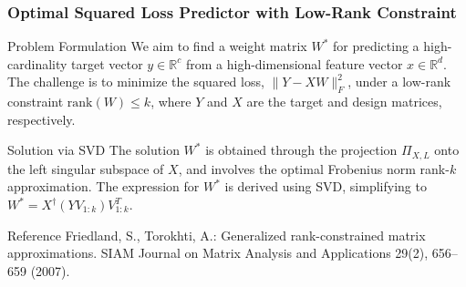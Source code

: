 \documentclass{beamer}
\begin{document}


\begin{frame}
\frametitle{Optimal Squared Loss Predictor with Low-Rank Constraint}
\begin{block}{Problem Formulation}
We aim to find a weight matrix \( W^* \) for predicting a high-cardinality target vector \( y \in \mathbb{R}^c \) from a high-dimensional feature vector \( x \in \mathbb{R}^d \). The challenge is to minimize the squared loss, \( \lVert Y - XW \rVert_F^2 \), under a low-rank constraint \( \text{rank}(W) \leq k \), where \( Y \) and \( X \) are the target and design matrices, respectively.
\end{block}

\begin{block}{Solution via SVD}
The solution \( W^* \) is obtained through the projection \( \Pi_{X,L} \) onto the left singular subspace of \( X \), and involves the optimal Frobenius norm rank-\( k \) approximation. The expression for \( W^* \) is derived using SVD, simplifying to \( W^* = X^\dagger(Y V_{1:k})V_{1:k}^T \).
\end{block}

\begin{block}{Reference}
Friedland, S., Torokhti, A.: Generalized rank-constrained matrix approximations. SIAM Journal on Matrix Analysis and Applications 29(2), 656–659 (2007).
\end{block}
\end{frame}
\end{document}
